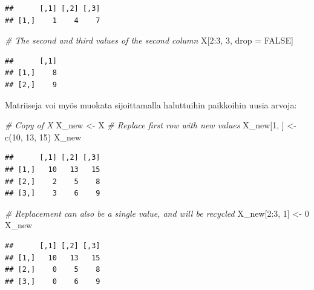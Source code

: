\documentclass[
]{book}
\newenvironment{Shaded}{\begin{snugshade}}{\end{snugshade}}
\newcommand{\CommentTok}[1]{\textcolor[rgb]{0.56,0.35,0.01}{\textit{#1}}}
\newcommand{\ConstantTok}[1]{\textcolor[rgb]{0.00,0.00,0.00}{#1}}
\newcommand{\DecValTok}[1]{\textcolor[rgb]{0.00,0.00,0.81}{#1}}
\newcommand{\FunctionTok}[1]{\textcolor[rgb]{0.00,0.00,0.00}{#1}}
\newcommand{\NormalTok}[1]{#1}
\newcommand{\OtherTok}[1]{\textcolor[rgb]{0.56,0.35,0.01}{#1}}
\newcommand{\SpecialCharTok}[1]{\textcolor[rgb]{0.00,0.00,0.00}{#1}}
\begin{document}
\begin{verbatim}
##      [,1] [,2] [,3]
## [1,]    1    4    7
\end{verbatim}

\begin{Shaded}
\begin{Highlighting}[]
\CommentTok{\# The second and third values of the second column}
\NormalTok{X[}\DecValTok{2}\SpecialCharTok{:}\DecValTok{3}\NormalTok{, }\DecValTok{3}\NormalTok{, drop }\OtherTok{=} \ConstantTok{FALSE}\NormalTok{]}
\end{Highlighting}
\end{Shaded}

\begin{verbatim}
##      [,1]
## [1,]    8
## [2,]    9
\end{verbatim}

Matriiseja voi myös muokata sijoittamalla haluttuihin paikkoihin uusia arvoja:

\begin{Shaded}
\begin{Highlighting}[]
\CommentTok{\# Copy of X}
\NormalTok{X\_new }\OtherTok{\textless{}{-}}\NormalTok{ X}
\CommentTok{\# Replace first row with new values}
\NormalTok{X\_new[}\DecValTok{1}\NormalTok{, ] }\OtherTok{\textless{}{-}} \FunctionTok{c}\NormalTok{(}\DecValTok{10}\NormalTok{, }\DecValTok{13}\NormalTok{, }\DecValTok{15}\NormalTok{)}
\NormalTok{X\_new}
\end{Highlighting}
\end{Shaded}

\begin{verbatim}
##      [,1] [,2] [,3]
## [1,]   10   13   15
## [2,]    2    5    8
## [3,]    3    6    9
\end{verbatim}

\begin{Shaded}
\begin{Highlighting}[]
\CommentTok{\# Replacement can also be a single value, and will be recycled}
\NormalTok{X\_new[}\DecValTok{2}\SpecialCharTok{:}\DecValTok{3}\NormalTok{, }\DecValTok{1}\NormalTok{] }\OtherTok{\textless{}{-}} \DecValTok{0}
\NormalTok{X\_new}
\end{Highlighting}
\end{Shaded}

\begin{verbatim}
##      [,1] [,2] [,3]
## [1,]   10   13   15
## [2,]    0    5    8
## [3,]    0    6    9
\end{verbatim}
\end{document}
